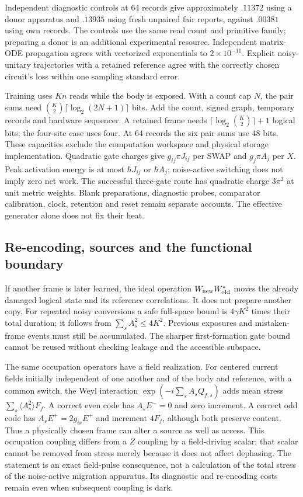 \documentclass[11pt]{article}
\theoremstyle{definition}
\theoremstyle{remark}
\begin{document}
Independent diagnostic controls at 64 records give approximately $.11372$
using a donor apparatus and $.13935$ using fresh unpaired fair reports,
against $.00381$ using own records. The controls use the same read count
and primitive family; preparing a donor is an additional experimental
resource. Independent matrix-ODE propagation agrees with vectorized
exponentials to $2\times10^{-11}$. Explicit noisy-unitary trajectories
with a retained reference agree with the correctly chosen circuit's loss
within one sampling standard error.

Training uses $Kn$ reads while the body is exposed. With a count cap $N$,
the pair sums need $\binom K2\lceil\log_2(2N+1)\rceil$ bits. Add the count,
signed graph, temporary records and hardware sequencer. A retained frame
needs $\lceil\log_2\binom K2\rceil+1$ logical bits; the four-site case uses
four. At 64 records the six pair sums use 48 bits. These capacities exclude
the computation workspace and physical storage implementation. Quadratic
gate charges give $g_{ij}\pi J_{ij}$ per SWAP and $g_j\pi A_j$ per $X$.
Peak activation energy is at most $\hbar J_{ij}$ or $\hbar A_j$; noise-active
switching does not imply zero net work. The successful three-gate route has
quadratic charge $3\pi^2$ at unit metric weights. Blank preparations,
diagnostic probes, comparator calibration, clock, retention and reset remain
separate accounts. The effective generator alone does not fix their heat.

\subsection{Re-encoding, sources and the functional boundary}

If another frame is later learned, the ideal operation $W_{\rm new}W_{\rm old}^*$
moves the already damaged logical state and its reference correlations.
It does not prepare another copy. For repeated noisy conversions a safe
full-space bound is $4\gamma K^2$ times their total duration; it follows
from $\sum_sA_s^2\le4K^2$. Previous exposures and mistaken-frame events
must still be accumulated. The sharper first-formation gate bound cannot
be reused without checking leakage and the accessible subspace.

The same occupation operators have a field realization. For centered current
fields initially independent of one another and of the body and reference,
with a common switch, the Weyl interaction
$\exp(-i\sum_sA_sQ_{f,s})$ adds mean stress
$\sum_s\langle A_s^2\rangle F_f$. A correct even code has $A_sE^-=0$
and zero increment. A correct odd code has $A_sE^+=2g_{is}E^+$ and
increment $4F_f$, although both preserve content. Thus a physically chosen
frame can alter a source as well as access. This occupation coupling
differs from a $Z$ coupling by a field-driving scalar; that scalar cannot
be removed from stress merely because it does not affect dephasing.
The statement is an exact field-pulse consequence, not a calculation of
the total stress of the noise-active migration apparatus. Its diagnostic
and re-encoding costs remain even when subsequent coupling is dark.
\end{document}
